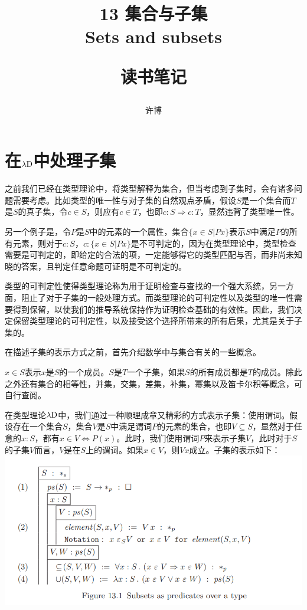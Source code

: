 \documentclass[UTF8]{article}
\title{13 集合与子集\\Sets and subsets\\[2ex]\begin{large}读书笔记\end{large}}
\author{许博}
\date{}
\begin{document}
\maketitle
	\section{在$\lambda{\rm D}$中处理子集}
	\noindent
	之前我们已经在类型理论中，将类型解释为集合，但当考虑到子集时，会有诸多问题需要考虑。比如类型的唯一性与对子集的自然观点矛盾，假设$S$是一个集合而$T$是$S$的真子集，令$c\in S$，则应有$c\in T$，也即$c:S\Rightarrow c:T$，显然违背了类型唯一性。
		
		另一个例子是，令$P$是$S$中的元素的一个属性，集合$\{x\in S|Px\}$表示$S$中满足$P$的所有元素，则对于$c:S$，$c:\{x\in S|Px\}$是不可判定的，因为在类型理论中，类型检查需要是可判定的，即给定的合法的项，一定能够得它的类型匹配与否，而非尚未知晓的答案，且判定任意命题可证明是不可判定的。
		
		类型的可判定性使得类型理论称为用于证明检查与查找的一个强大系统，另一方面，阻止了对于子集的一般处理方式。而类型理论的可判定性以及类型的唯一性需要得到保留，以使我们的推导系统保持作为证明检查基础的有效性。因此，我们决定保留类型理论的可判定性，以及接受这个选择所带来的所有后果，尤其是关于子集的。
		
		在描述子集的表示方式之前，首先介绍数学中与集合有关的一些概念。
		
		$x\in S$表示$x$是$S$的一个成员。$S$是$T$一个子集，如果$S$的所有成员都是$T$的成员。除此之外还有集合的相等性，并集，交集，差集，补集，幂集以及笛卡尔积等概念，可自行查阅。
		
		在类型理论$\lambda{\rm D}$中，我们通过一种顺理成章又精彩的方式表示子集：使用谓词。假设存在一个集合$S$，集合$V$是$S$中满足谓词$P$的元素的集合，也即$V\subseteq S$，显然对于任意的$x:S$，都有$x\in V\Leftrightarrow P(x)$。此时，我们使用谓词$P$来表示子集$V$，此时对于$S$的子集$V$而言，$V$是在$S$上的谓词。如果$x\in V$，则$Vx$成立。子集的表示如下：\\
		\includegraphics[width=0.93\linewidth]{"../imgs/13-1.png"}
		
\end{document}
